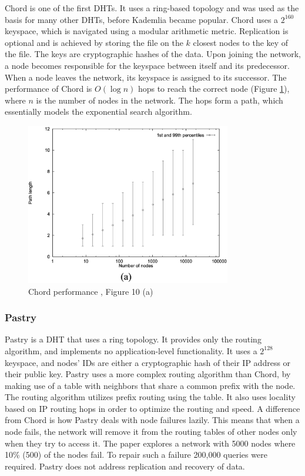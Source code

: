 Chord \cite{chord} is one of the first DHTs.
It uses a ring-based topology and was used as the basis for many other DHTs,
before Kademlia \cite{kademlia} became popular.
Chord uses a $2^{160}$ keyspace, which is navigated using a modular arithmetic metric.
Replication is optional and is achieved by storing the file on the $k$ closest nodes to the key of the file.
The keys are cryptographic hashes of the data.
Upon joining the network, a node becomes responsible for the keyspace between itself and its predecessor.
When a node leaves the network, its keyspace is assigned to its successor.
The performance of Chord is $O(\log n)$ hops to reach the correct node (Figure \ref{fig:chord-performance}),
where $n$ is the number of nodes in the network.
The hops form a path, which essentially models the exponential search algorithm.

\begin{figure}
    \centering
    \includegraphics[width=0.8\textwidth]{gfx/chord-performance.png}
    \caption{Chord performance \cite{chord}, Figure 10 (a)}
    \label{fig:chord-performance}
\end{figure}

\subsubsection{Pastry}

Pastry \cite{pastry} is a DHT that uses a ring topology.
It provides only the routing algorithm, and implements no application-level functionality.
It uses a $2^{128}$ keyspace, and nodes' IDs are either a cryptographic hash
of their IP address or their public key.
Pastry uses a more complex routing algorithm than Chord, by making use of a table with
neighbors that share a common prefix with the node.
The routing algorithm utilizes prefix routing using the table.
It also uses locality based on IP routing hops in order to optimize the routing and speed.
A difference from Chord is how Pastry deals with node failures lazily.
This means that when a node fails, the network will remove it from the routing tables of other nodes
only when they try to access it.
The paper explores a network with 5000 nodes where 10\% (500) of the nodes fail.
To repair such a failure 200,000 queries were required.
Pastry does not address replication and recovery of data.


